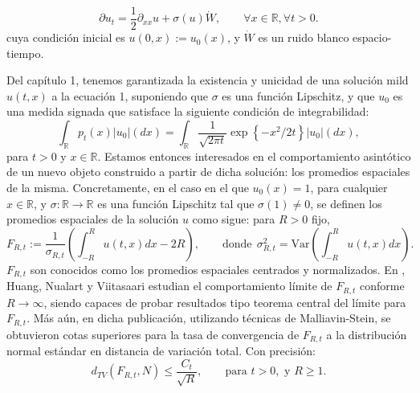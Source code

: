 \documentclass[letterpaper,twoside,12pt]{book}
\newcommand{\R}{\mathbb{R}}
\newcommand{\1}{\mathds{1}}
\newcommand{\abs}[1]{\left\lvert #1 \right\rvert}
\renewcommand{\to}{\rightarrow}
\theoremstyle{definition}
\theoremstyle{definition}
\theoremstyle{definition}
\theoremstyle{definition}
\theoremstyle{definition}
\theoremstyle{definition}
\theoremstyle{definition}
\begin{document}
\begin{equation}
\partial u_t=\frac{1}{2}\partial_{xx}u+\sigma(u)\dot{W}, \qquad \forall x\in \R, \forall t>0.
\end{equation}
cuya condición inicial es $u(0,x):=u_0(x)$, y $\dot{W}$ es un ruido blanco espacio-tiempo.

Del capítulo 1, tenemos garantizada la existencia y unicidad de una solución mild $u(t,x)$ a la ecuación 1, suponiendo que $\sigma$ es una función Lipschitz, y que $u_0$ es una medida signada que satisface la siguiente condición de integrabilidad:
\[
\int_\R p_t(x)\abs{u_0}(dx)=\int_\R\frac{1}{\sqrt{2\pi t}}\exp \left\{-x^2/2t\right\}\abs{u_0}(dx),    
\]
para $t>0$ y $x\in \R$. Estamos entonces interesados en el comportamiento asintótico de un nuevo objeto construido a partir de dicha solución: los promedios espaciales de la misma. Concretamente, en el caso en el que $u_0(x)=1$, para cualquier $x\in \R$, y $\sigma:\R\to\R$ es una función Lipschitz tal que $\sigma(1)\neq 0$, se definen los promedios espaciales de la solución $u$ como sigue: para $R>0$ fijo, 
\begin{equation}
    F_{R,t}:=\frac{1}{\sigma_{R,t}}\left(\int_{-R}^{R}u(t,x)dx -2R\right), \qquad \text{donde} \ \ \sigma^2_{R,t}=\text{Var}\left(\int_{-R}^{R}u(t,x)dx\right).
\end{equation}
$F_{R,t}$ son conocidos como los promedios espaciales centrados y normalizados. En \cite{HUANG20207170}, Huang, Nualart y Viitasaari estudian el comportamiento límite de $F_{R,t}$ conforme $R\to \infty$, siendo capaces de probar resultados tipo teorema central del límite para $F_{R,t}$. Más aún, en dicha publicación, utilizando técnicas de Malliavin-Stein, se obtuvieron cotas superiores para la tasa de convergencia de $F_{R,t}$ a la distribución normal estándar en distancia de variación total. Con precisión:
\begin{equation}
    d_{TV}(F_{R,t},N)\leq \frac{C_t}{\sqrt{R}}, \qquad \text{para }t>0,\text{ y } R\geq1.  
\end{equation}
\end{document}
